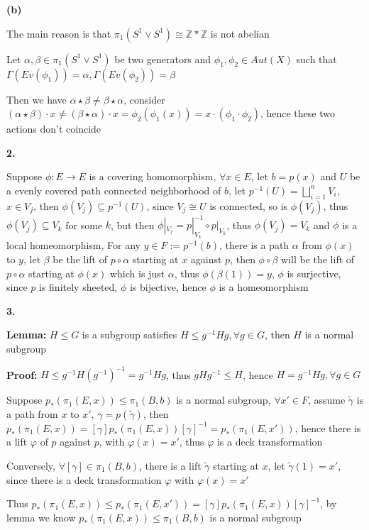 \documentclass[12pt]{article}
\begin{document}
\textbf{(b)} \par
The main reason is that $\pi_1(S^1\vee S^1)\cong\mathbb{Z}*\mathbb{Z}$ is not abelian \par
Let $\alpha,\beta\in\pi_1(S^1\vee S^1)$ be two generators and $\phi_1,\phi_2\in Aut(X)$ such that $\Gamma(Ev(\phi_1))=\alpha, \Gamma(Ev(\phi_2))=\beta$ \par
Then we have $\alpha\star\beta\neq\beta\star\alpha$, consider $(\alpha\star\beta)\cdot x\neq (\beta\star\alpha)\cdot x=\phi_2(\phi_1(x))=x\cdot(\phi_1\cdot\phi_2)$, hence these two actions don't coincide \par
\textbf{2.} \par
Suppose $\phi: E\rightarrow E$ is a covering homomorphism, $\forall x\in E$, let $b=p(x)$ and $U$ be a evenly covered path connected neighborhood of $b$, let $p^{-1}(U)=\displaystyle\bigsqcup_{i=1}^nV_i$, $x\in V_j$, then $\phi(V_j)\subseteq p^{-1}(U)$, since $V_j\cong U$ is connected, so is $\phi(V_j)$, thus $\phi(V_j)\subseteq V_k$ for some $k$, but then $\phi|_{V_j}=p|_{V_k}^{-1}\circ p|_{V_k}$, thus $\phi(V_j)=V_k$ and $\phi$ is a local homeomorphism, For any $y\in F:=p^{-1}({b})$, there is a path $\alpha$ from $\phi(x)$ to $y$, let $\beta$ be the lift of $p\circ\alpha$ starting at $x$ against $p$, then $\phi\circ\beta$ will be the lift of $p\circ\alpha$ starting at $\phi(x)$ which is just $\alpha$, thus $\phi(\beta(1))=y$, $\phi$ is surjective, since $p$ is finitely sheeted, $\phi$ is bijective, hence $\phi$ is a homeomorphism \par
\textbf{3.} \par
\textbf{Lemma:} $H\leq G$ is a subgroup satisfies $H\leq g^{-1}Hg, \forall g\in G$, then $H$ is a normal subgroup \par
\textbf{Proof:} $H\leq g^{-1}H(g^{-1})^{-1}=g^{-1}Hg$, thus $gHg^{-1}\leq H$, hence $H=g^{-1}Hg, \forall g\in G$ \par
Suppose $p_*(\pi_1(E,x))\leq\pi_1(B,b)$ is a normal subgroup, $\forall x'\in F$, assume $\widetilde{\gamma}$ is a path from $x$ to $x'$, $\gamma=p(\widetilde{\gamma})$, then $p_*(\pi_1(E,x))=[\gamma]p_*(\pi_1(E,x))[\gamma]^{-1}=p_*(\pi_1(E,x'))$, hence there is a lift $\varphi$ of $p$ against $p$, with $\varphi(x)=x'$, thus $\varphi$ is a deck transformation \par
Conversely, $\forall [\gamma]\in\pi_1(B,b)$, there is a lift $\widetilde{\gamma}$ starting at $x$, let $\widetilde{\gamma}(1)=x'$, since there is a deck transformation $\varphi$ with $\varphi(x)=x'$ \par
Thus $p_*(\pi_1(E,x))\leq p_*(\pi_1(E,x'))=[\gamma]p_*(\pi_1(E,x))[\gamma]^{-1}$, by lemma we know $p_*(\pi_1(E,x))\leq\pi_1(B,b)$ is a normal subgroup
\end{document}
